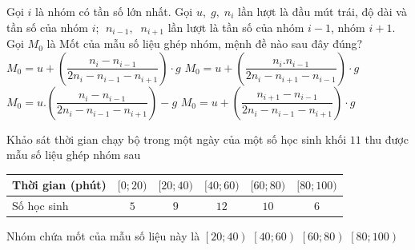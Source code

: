 \begin{ex}%
	Gọi $i$ là nhóm có tần số lớn nhất. Gọi $u,\; g,\; n_i$ lần lượt là đầu mút trái, độ dài và tần số của nhóm $i$; $\; n_{i-1}, \; \; n_{i+1}$ lần lượt là tần số của nhóm $i-1$, nhóm $i+1$. Gọi  $M_0$ là Mốt của mẫu số liệu ghép nhóm, mệnh đề nào sau đây đúng?
	 \choice
		{\True  $M_0=u+\left(\dfrac{n_i-n_{i-1}}{2n_i-n_{i-1}-n_{i+1}} \right)\cdot g$}
		{$M_0=u+\left(\dfrac{n_i.n_{i-1}}{2n_i-n_{i+1}-n_{i-1}}  \right)\cdot g$}
		{$M_0=u.\left(\dfrac{n_i-n_{i-1}}{2n_i-n_{i-1}-n_{i+1}}  \right)-g$}
		{$M_0=u+\left(\dfrac{n_{i+1}-n_{i-1}}{2n_i-n_{i-1}-n_{i+1}} \right)\cdot  g$}
\end{ex}

\begin{ex}%
	Khảo sát thời gian chạy bộ trong một ngày của một số học sinh khối $11$ thu được mẫu  số liệu ghép nhóm sau
	\begin{center}
		\begin{tabular}{|l|c|c|c|c|c|}
			\hline Thời gian (phút) & $[0;  20)$ & $[20; 40)$& $[40; 60)$ & $[60; 80)$ & $[80; 100)$ \\
			\hline Số  học sinh & $5$ & $9$ & $12$ & $10$ & $6$ \\
			\hline 
		\end{tabular}
	\end{center}
	Nhóm chứa  mốt của mẫu số liệu này là
	\choice 
		 {$\left[20;40\right)$}
		 {\True $\left[40;60\right)$}
		{$\left[60;80\right)$} 
		 {$\left[80;100\right)$}
	\loigiai{ 
		Nhóm chứa mốt của mẫu số liệu này  là $\left[40;60\right)$.
	 }
\end{ex}

